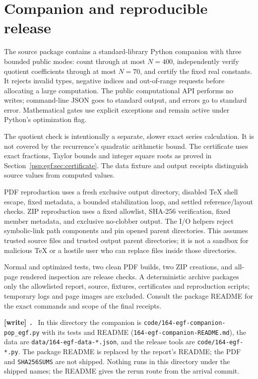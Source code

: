 \documentclass[11pt,letterpaper]{article}
\numberwithin{equation}{section}
\theoremstyle{remark}\newtheorem{remark}[theorem]{Remark}
\newcommand{\file}[1]{\nolinkurl{#1}}
\newenvironment{writenote}[1][]{\par\smallskip\begingroup\small
 \noindent\textbf{[write]}\if\relax\detokenize{#1}\relax\else~\textbf{#1.}\fi\ }%
 {\par\endgroup\smallskip}
\begin{document}
\section{Companion and reproducible release}\label{psp:egf:sec:companion}
The source package contains a standard-library Python companion with
three bounded public modes: count through at most $N=400$, independently
verify quotient coefficients through at most $N=70$, and certify the
fixed real constants. It rejects invalid types, negative indices and
out-of-range requests before allocating a large computation. The public
computational API performs no writes; command-line JSON goes to standard
output, and errors go to standard error. Mathematical gates use explicit
exceptions and remain active under Python's optimization flag.

The quotient check is intentionally a separate, slower exact series
calculation. It is not covered by the recurrence's quadratic arithmetic
bound. The certificate uses exact fractions, Taylor bounds and integer
square roots as proved in Section~\ref{psp:egf:sec:certificate}. The data fixture
and output receipts distinguish source values from computed values.

PDF reproduction uses a fresh exclusive output directory, disabled TeX
shell escape, fixed metadata, a bounded stabilization loop, and settled
reference/layout checks. ZIP reproduction uses a fixed allowlist, SHA-256
verification, fixed member metadata, and exclusive no-clobber output.
The I/O helpers reject symbolic-link path components and pin opened
parent directories. This assumes trusted source files and trusted output
parent directories; it is not a sandbox for malicious TeX or a hostile
user who can replace files inside those directories.

Normal and optimized tests, two clean PDF builds, two ZIP creations,
and all-page rendered inspection are release checks. A deterministic
archive packages only the allowlisted report, source, fixtures,
certificates and reproduction scripts; temporary logs and page images
are excluded. Consult the package README for the exact commands and
scope of the final receipts.
\begin{writenote}
In this directory the companion is \file{code/164-egf-companion-pop_egf.py} with its tests and README (\file{164-egf-companion-README.md}), the data are \file{data/164-egf-data-*.json}, and the release tools are \file{code/164-egf-*.py}. The package README is replaced by the report's README; the PDF and \file{SHA256SUMS} are not shipped. Nothing runs in this directory under the shipped names; the README gives the rerun route from the arrival commit.
\end{writenote}
\clearpage
\end{document}
